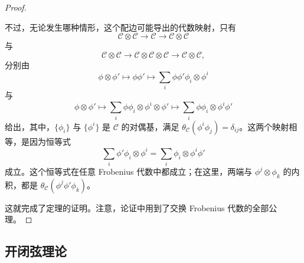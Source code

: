 \begin{proof}
\begin{figure}[H]
\centering
{}
\BookNumberOnlyCaption\label{fig:2.35}
\end{figure}

不过，无论发生哪种情形，这个配边可能导出的代数映射，只有
\[
\mathcal{C}\otimes\mathcal{C}\longrightarrow\mathcal{C}\longrightarrow\mathcal{C}\otimes\mathcal{C}
\]
与
\[
\mathcal{C}\otimes\mathcal{C}\longrightarrow\mathcal{C}\otimes\mathcal{C}\otimes\mathcal{C}
\longrightarrow\mathcal{C}\otimes\mathcal{C},
\]
分别由
\[
\phi\otimes\phi'\longmapsto\phi\phi'\longmapsto\sum_i\phi\phi'\phi_i\otimes\phi^i
\]
与
\[
\phi\otimes\phi'\longmapsto\sum_i\phi\phi_i\otimes\phi^i\otimes\phi'
\longmapsto\sum_i\phi\phi_i\otimes\phi^i\phi'
\]
给出，其中，$\{\phi_i\}$ 与 $\{\phi^i\}$ 是 $\mathcal{C}$ 的对偶基，满足 $\theta_{\mathcal{C}}(\phi^i\phi_j)=\delta_{ij}$。这两个映射相等，是因为恒等式
\begin{equation}\label{eq:2.111}
\sum_i\phi'\phi_i\otimes\phi^i=\sum_i\phi_i\otimes\phi^i\phi'
\end{equation}
成立。这个恒等式在任意 Frobenius 代数中都成立；在这里，两端与 $\phi^j\otimes\phi_k$ 的内积，都是 $\theta_{\mathcal{C}}(\phi^j\phi'\phi_k)$。

这就完成了定理的证明。注意，论证中用到了交换 Frobenius 代数的全部公理。
\end{proof}

\subsection{开闭弦理论}\label{sec:2.7.2}

